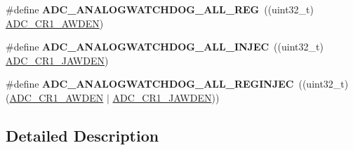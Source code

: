 \begin{DoxyCompactItemize}
\item 
\hypertarget{group___a_d_c__analog__watchdog__mode_gad9d25140644089dd34084cb4dfa7ebd8}{\#define {\bfseries A\-D\-C\-\_\-\-A\-N\-A\-L\-O\-G\-W\-A\-T\-C\-H\-D\-O\-G\-\_\-\-A\-L\-L\-\_\-\-R\-E\-G}~((uint32\-\_\-t) \hyperlink{group___peripheral___registers___bits___definition_ga6e006d43fcb9fe1306745c95a1bdd651}{A\-D\-C\-\_\-\-C\-R1\-\_\-\-A\-W\-D\-E\-N})}\label{group___a_d_c__analog__watchdog__mode_gad9d25140644089dd34084cb4dfa7ebd8}

\item 
\hypertarget{group___a_d_c__analog__watchdog__mode_gacf2ee0d67e728fd6258270b239823713}{\#define {\bfseries A\-D\-C\-\_\-\-A\-N\-A\-L\-O\-G\-W\-A\-T\-C\-H\-D\-O\-G\-\_\-\-A\-L\-L\-\_\-\-I\-N\-J\-E\-C}~((uint32\-\_\-t) \hyperlink{group___peripheral___registers___bits___definition_ga4886de74bcd3a1e545094089f76fd0b3}{A\-D\-C\-\_\-\-C\-R1\-\_\-\-J\-A\-W\-D\-E\-N})}\label{group___a_d_c__analog__watchdog__mode_gacf2ee0d67e728fd6258270b239823713}

\item 
\hypertarget{group___a_d_c__analog__watchdog__mode_ga8ab72f0e7dfee943acb5cccacff7e4a0}{\#define {\bfseries A\-D\-C\-\_\-\-A\-N\-A\-L\-O\-G\-W\-A\-T\-C\-H\-D\-O\-G\-\_\-\-A\-L\-L\-\_\-\-R\-E\-G\-I\-N\-J\-E\-C}~((uint32\-\_\-t)(\hyperlink{group___peripheral___registers___bits___definition_ga6e006d43fcb9fe1306745c95a1bdd651}{A\-D\-C\-\_\-\-C\-R1\-\_\-\-A\-W\-D\-E\-N} $\vert$ \hyperlink{group___peripheral___registers___bits___definition_ga4886de74bcd3a1e545094089f76fd0b3}{A\-D\-C\-\_\-\-C\-R1\-\_\-\-J\-A\-W\-D\-E\-N}))}\label{group___a_d_c__analog__watchdog__mode_ga8ab72f0e7dfee943acb5cccacff7e4a0}

\end{DoxyCompactItemize}


\subsection{Detailed Description}
